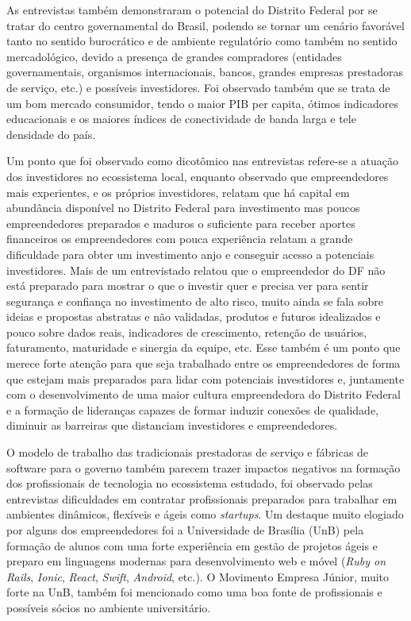 As entrevistas também demonstraram o potencial do Distrito Federal por se tratar do centro governamental do Brasil, podendo se tornar um cenário favorável tanto no sentido burocrático e de ambiente regulatório como também no sentido mercadológico, devido a presença de grandes compradores (entidades governamentais, organismos internacionais, bancos, grandes empresas prestadoras de serviço, etc.) e possíveis investidores. Foi observado também que se trata de um bom mercado consumidor, tendo o maior PIB per capita, ótimos indicadores educacionais e os maiores índices de conectividade de banda larga e tele densidade do país.

Um ponto que foi observado como dicotômico nas entrevistas refere-se a atuação dos investidores no ecossistema local, enquanto observado que empreendedores mais experientes, e os próprios investidores, relatam que há capital em abundância disponível no Distrito Federal para investimento mas poucos empreendedores preparados e maduros o suficiente para receber aportes financeiros os empreendedores com pouca experiência relatam a grande dificuldade para obter um investimento anjo e conseguir acesso a potenciais investidores. Mais de um entrevistado relatou que o empreendedor do DF não está preparado para mostrar o que o investir quer e precisa ver para sentir segurança e confiança no investimento de alto risco, muito ainda se fala sobre ideias e propostas abstratas e não validadas, produtos e futuros idealizados e pouco sobre dados reais, indicadores de crescimento, retenção de usuários, faturamento, maturidade e sinergia da equipe, etc. Esse também é um ponto que merece forte atenção para que seja trabalhado entre os empreendedores de forma que estejam mais preparados para lidar com potenciais investidores e, juntamente com o desenvolvimento de uma maior cultura empreendedora do Distrito Federal e a formação de lideranças capazes de formar induzir conexões de qualidade, diminuir as barreiras que distanciam investidores e empreendedores.

O modelo de trabalho das tradicionais prestadoras de serviço e fábricas de software para o governo também parecem trazer impactos negativos na formação dos profissionais de tecnologia no ecossistema estudado, foi observado pelas entrevistas dificuldades em contratar profissionais preparados para trabalhar em ambientes dinâmicos, flexíveis e ágeis como \textit{startups}. Um destaque muito elogiado por alguns dos empreendedores foi a Universidade de Brasília (UnB) pela formação de alunos com uma forte experiência em gestão de projetos ágeis e preparo em linguagens modernas para desenvolvimento web e móvel (\textit{Ruby on Rails}, \textit{Ionic}, \textit{React}, \textit{Swift}, \textit{Android}, etc.). O Movimento Empresa Júnior, muito forte na UnB, também foi mencionado como uma boa fonte de profissionais e possíveis sócios no ambiente universitário.

